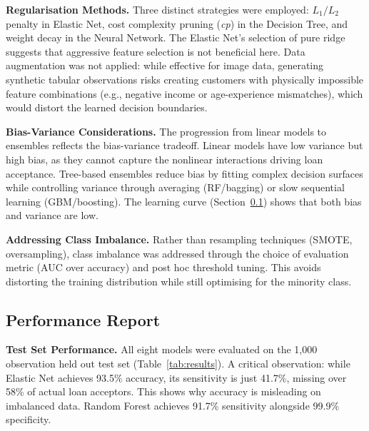 \noindent\textbf{Regularisation Methods.}
Three distinct strategies were employed: $L_1/L_2$ penalty in Elastic Net, cost complexity pruning (\textit{cp}) in the Decision Tree, and weight decay in the Neural Network. The Elastic Net's selection of pure ridge suggests that aggressive feature selection is not beneficial here. Data augmentation was not applied: while effective for image data, generating synthetic tabular observations risks creating customers with physically impossible feature combinations (e.g., negative income or age-experience mismatches), which would distort the learned decision boundaries.

\noindent\textbf{Bias-Variance Considerations.}
The progression from linear models to ensembles reflects the bias-variance tradeoff. Linear models have low variance but high bias, as they cannot capture the nonlinear interactions driving loan acceptance. Tree-based ensembles reduce bias by fitting complex decision surfaces while controlling variance through averaging (RF/bagging) or slow sequential learning (GBM/boosting). The learning curve (Section~\ref{sec:performance}) shows that both bias and variance are low.

\noindent\textbf{Addressing Class Imbalance.}
Rather than resampling techniques (SMOTE, oversampling), class imbalance was addressed through the choice of evaluation metric (AUC over accuracy) and post hoc threshold tuning. This avoids distorting the training distribution while still optimising for the minority class.

\subsection{Performance Report}\label{sec:performance}

\noindent\textbf{Test Set Performance.}
All eight models were evaluated on the 1,000 observation held out test set (Table~\ref{tab:results}). A critical observation: while Elastic Net achieves 93.5\% accuracy, its sensitivity is just 41.7\%, missing over 58\% of actual loan acceptors. This shows why accuracy is misleading on imbalanced data. Random Forest achieves 91.7\% sensitivity alongside 99.9\% specificity.

